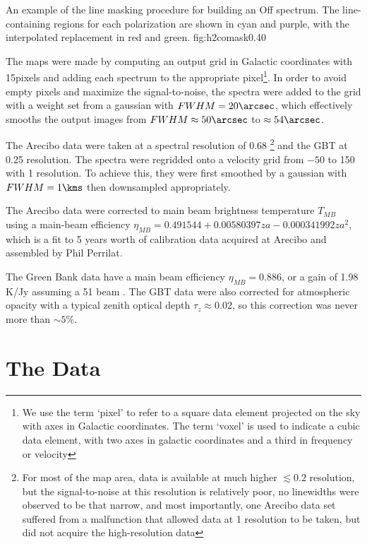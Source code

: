 {An example of the \formaldehyde line masking procedure for building an Off
spectrum.  The line-containing regions for each polarization are shown in cyan
and purple, with the interpolated replacement in red and green.
}{fig:h2comask}{0.4}{0}

The maps were made by computing an output grid in Galactic coordinates with
15\arcsec pixels and adding each spectrum to the appropriate pixel\footnote{We
use the term `pixel' to refer to a square data element projected on the sky
with axes in Galactic coordinates.  The term `voxel' is used to indicate a
cubic data element, with two axes in galactic coordinates and a third in
frequency or velocity}.  In order
to avoid empty pixels and maximize the signal-to-noise, the spectra were added
to the grid with a weight set from a gaussian with $FWHM=20\arcsec$, which
effectively smooths the output images from $FWHM\approx50\arcsec$ to
$\approx54\arcsec$.  

The Arecibo data were taken at a spectral resolution of 0.68 \kms\footnote{For
most of the map area, data is available at much higher $\lesssim0.2$ \kms
resolution, but the signal-to-noise at this resolution is relatively poor, no
linewidths were observed to be that narrow, and most importantly, one Arecibo
data set suffered from a malfunction that allowed data at 1 \kms resolution to
be taken, but did not acquire the high-resolution data} and the GBT at 0.25
\kms resolution.  The spectra were regridded onto a velocity grid from $-50$ to
150 \kms with 1 \kms resolution.  To achieve this, they were first smoothed by
a gaussian with $FWHM=1 \kms$ then downsampled appropriately.

The Arecibo data were corrected to main beam brightness temperature $T_{MB}$
using a main-beam efficiency $\eta_{MB} = 0.491544 + 0.00580397 za -
0.000341992 za^2$, which is a fit to 5 years worth of calibration data acquired
at Arecibo and assembled by Phil Perrilat.

The Green Bank data have a main beam efficiency $\eta_{MB} = 0.886$, or a gain
of 1.98 K/Jy assuming a 51 \arcsec beam \citep[see][for additional
discussion]{Mangum2013a}.  The GBT data were also corrected for atmospheric
opacity with a typical zenith optical depth $\tau_{z}\approx0.02$, so this
correction was never more than $\sim5\%$.

\section{The Data}

